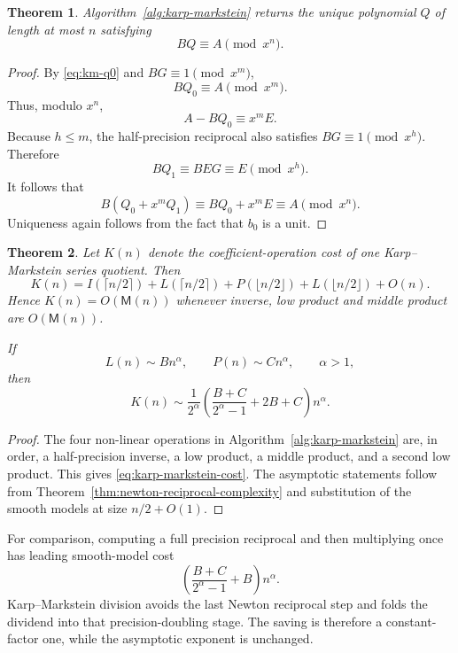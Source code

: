 \documentclass[11pt]{book}
\newtheorem{theorem}{Theorem}[section]
\theoremstyle{definition}
\begin{document}
\begin{theorem}\label{thm:karp-markstein-correctness}
Algorithm~\ref{alg:karp-markstein} returns the unique polynomial $Q$ of length
at most $n$ satisfying
\[
 BQ\equiv A\pmod{x^n}.
\]
\end{theorem}

\begin{proof}
By \eqref{eq:km-q0} and $BG\equiv1\pmod{x^m}$,
\[
 BQ_0\equiv A\pmod{x^m}.
\]
Thus, modulo $x^n$,
\[
 A-BQ_0\equiv x^mE.
\]
Because $h\leq m$, the half-precision reciprocal also satisfies
$BG\equiv1\pmod{x^h}$.  Therefore
\[
 BQ_1
 \equiv BEG
 \equiv E
 \pmod{x^h}.
\]
It follows that
\[
 B(Q_0+x^mQ_1)
 \equiv BQ_0+x^mE
 \equiv A
 \pmod{x^n}.
\]
Uniqueness again follows from the fact that $b_0$ is a unit.
\end{proof}

\begin{theorem}\label{thm:karp-markstein-complexity}
Let $K(n)$ denote the coefficient-operation cost of one Karp--Markstein series
quotient.  Then
\begin{equation}\label{eq:karp-markstein-cost}
 K(n)
 =I(\lceil n/2\rceil)
  +L(\lceil n/2\rceil)
  +P(\lfloor n/2\rfloor)
  +L(\lfloor n/2\rfloor)
  +O(n).
\end{equation}
Hence $K(n)=O(\mathsf M(n))$ whenever inverse, low product and middle product
are $O(\mathsf M(n))$.

If
\[
 L(n)\sim Bn^\alpha,
 \qquad P(n)\sim Cn^\alpha,
 \qquad \alpha>1,
\]
then
\begin{equation}\label{eq:karp-markstein-leading-constant}
 K(n)
 \sim
 \frac{1}{2^\alpha}
 \left(
   \frac{B+C}{2^\alpha-1}+2B+C
 \right)n^\alpha.
\end{equation}
\end{theorem}

\begin{proof}
The four non-linear operations in Algorithm~\ref{alg:karp-markstein} are,
in order, a half-precision inverse, a low product, a middle product, and a
second low product.  This gives \eqref{eq:karp-markstein-cost}.  The asymptotic
statements follow from Theorem~\ref{thm:newton-reciprocal-complexity} and
substitution of the smooth models at size $n/2+O(1)$.
\end{proof}

For comparison, computing a full precision reciprocal and then multiplying
once has leading smooth-model cost
\begin{equation}\label{eq:full-preinverse-oneoff-cost}
 \left(
  \frac{B+C}{2^\alpha-1}+B
 \right)n^\alpha.
\end{equation}
Karp--Markstein division avoids the last Newton reciprocal step and folds the
dividend into that precision-doubling stage.  The saving is therefore a
constant-factor one, while the asymptotic exponent is unchanged.
\end{document}
